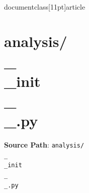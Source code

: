 \\documentclass[11pt]{article}
\begin{document}
\section*{analysis/\\_\\_init\\_\\_.py}
\textbf{Source Path}: \texttt{analysis/\\_\\_init\\_\\_.py}\par
\bigskip
\begin{CodeBlock}

\end{CodeBlock}
\end{document}
